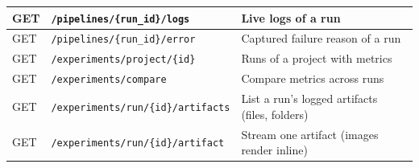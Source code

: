 \begin{table}[H]
\begin{tabularx}{\textwidth}{|p{2.1cm}|p{5.6cm}|X|}
GET  & \texttt{/pipelines/\{run\_id\}/logs} & Live logs of a run\\ \hline
GET  & \texttt{/pipelines/\{run\_id\}/error} & Captured failure reason of a run\\ \hline
GET  & \texttt{/experiments/project/\{id\}} & Runs of a project with metrics\\ \hline
GET  & \texttt{/experiments/compare} & Compare metrics across runs\\ \hline
GET  & \texttt{/experiments/run/\{id\}/artifacts} & List a run's logged artifacts (files, folders)\\ \hline
GET  & \texttt{/experiments/run/\{id\}/artifact} & Stream one artifact (images render inline)\\ \hline
\end{tabularx}
\end{table}

